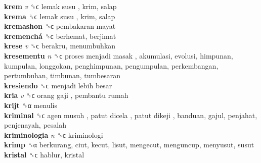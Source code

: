 \textbf{krem} \emph{v}  ␝ϲ   lemak susu , krim, salap  \\
\textbf{krema} ␝ϲ   lemak susu , krim, salap  \\
\textbf{kremashon} ␝ϲ   pembakaran mayat   \\
\textbf{kremenchá} ␝ϲ  berhemat, berjimat  \\
\textbf{krese} \emph{v}  ␝ϲ  berakru, menumbuhkan  \\
\textbf{kresementu} \emph{n}  ␝ϲ   proses menjadi masak , akumulasi, evolusi, himpunan, kumpulan, longgokan, penghimpunan, pengumpulan, perkembangan, pertumbuhan, timbunan, tumbesaran  \\
\textbf{kresiendo} ␝ϲ   menjadi lebih besar   \\
\textbf{kria} \emph{v}  ␝ϲ   orang gaji ,  pembantu rumah   \\
\textbf{krijt} ␝α  menulis  \\
\textbf{kriminal} ␝ϲ   agen musuh ,  patut dicela ,  patut dikeji , banduan, gajul, penjahat, penjenayah, pesalah  \\
\textbf{kriminologia} \emph{n}  ␝ϲ  kriminologi  \\
\textbf{krimp} ␝α  berkurang, ciut, kecut, lisut, mengecut, menguncup, menyusut, susut  \\
\textbf{kristal} ␝ϲ  hablur, kristal  \\
